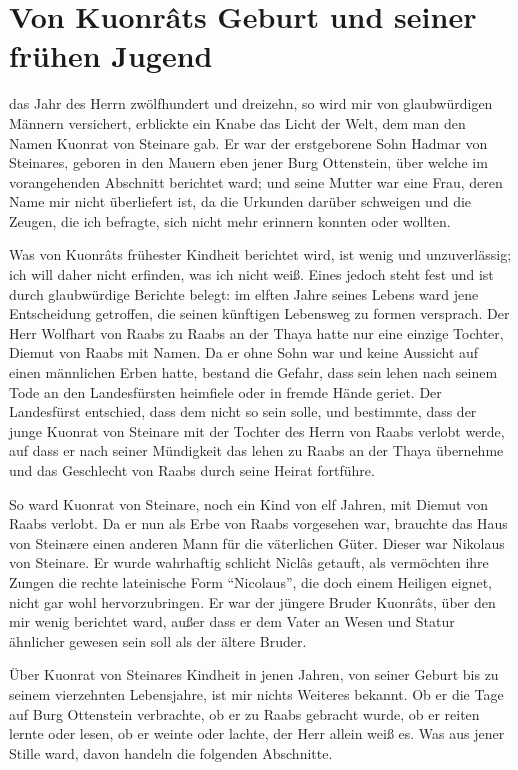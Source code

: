 \section{Von Kuonr\^{a}ts Geburt und seiner frühen Jugend}

 das Jahr des Herrn zwölfhundert und dreizehn, so wird mir von glaubwürdigen Männern versichert, erblickte ein Knabe das Licht der Welt, dem man den Namen \gls{Kuonrat von Steinare} gab. Er war der erstgeborene Sohn \gls{Hadmar von Steinare}s, geboren in den Mauern eben jener Burg Ottenstein, über welche im vorangehenden Abschnitt berichtet ward; und seine Mutter war eine Frau, deren Name mir nicht überliefert ist, da die Urkunden darüber schweigen und die Zeugen, die ich befragte, sich nicht mehr erinnern konnten oder wollten.

Was von Kuonr\^{a}ts frühester Kindheit berichtet wird, ist wenig und unzuverlässig; ich will daher nicht erfinden, was ich nicht weiß. Eines jedoch steht fest und ist durch glaubwürdige Berichte belegt: im elften Jahre seines Lebens ward jene Entscheidung getroffen, die seinen künftigen Lebensweg zu formen versprach. Der Herr \gls{Wolfhart von Raabs} zu \gls{Raabs an der Thaya} hatte nur eine einzige Tochter, \gls{Diemut von Raabs} mit Namen. Da er ohne Sohn war und keine Aussicht auf einen männlichen Erben hatte, bestand die Gefahr, dass sein \gls{lehen} nach seinem Tode an den Landesfürsten heimfiele oder in fremde Hände geriet. Der Landesfürst entschied, dass dem nicht so sein solle, und bestimmte, dass der junge \gls{Kuonrat von Steinare} mit der Tochter des Herrn von Raabs verlobt werde, auf dass er nach seiner Mündigkeit das \gls{lehen} zu \gls{Raabs an der Thaya} übernehme und das Geschlecht von Raabs durch seine Heirat fortführe.

So ward \gls{Kuonrat von Steinare}, noch ein Kind von elf Jahren, mit \gls{Diemut von Raabs} verlobt. Da er nun als Erbe von Raabs vorgesehen war, brauchte das Haus von Steinære einen anderen Mann für die väterlichen Güter. Dieser war \gls{Nikolaus von Steinare}.  Er wurde wahrhaftig schlicht Niclâs getauft, als vermöchten ihre Zungen die rechte lateinische Form \enquote{Nicolaus}, die doch einem Heiligen eignet, nicht gar wohl hervorzubringen. Er war der jüngere Bruder Kuonr\^{a}ts, über den mir wenig berichtet ward, außer dass er dem Vater an Wesen und Statur ähnlicher gewesen sein soll als der ältere Bruder.

Über \gls{Kuonrat von Steinare}s Kindheit in jenen Jahren, von seiner Geburt bis zu seinem vierzehnten Lebensjahre, ist mir nichts Weiteres bekannt. Ob er die Tage auf Burg Ottenstein verbrachte, ob er zu Raabs gebracht wurde, ob er reiten lernte oder lesen, ob er weinte oder lachte, der Herr allein weiß es. Was aus jener Stille ward, davon handeln die folgenden Abschnitte.